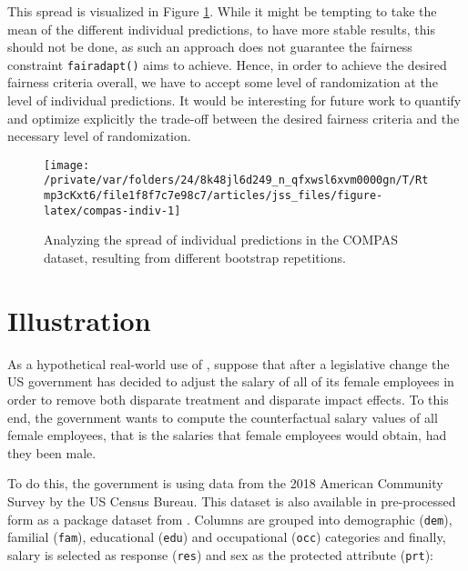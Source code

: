 \documentclass[
  nojss]{jss}
\begin{document}
This spread is visualized in Figure \ref{fig:compas-indiv}. While it
might be tempting to take the mean of the different individual
predictions, to have more stable results, this should not be done, as
such an approach does not guarantee the fairness constraint
\texttt{fairadapt()} aims to achieve. Hence, in order to achieve the
desired fairness criteria overall, we have to accept some level of
randomization at the level of individual predictions. It would be
interesting for future work to quantify and optimize explicitly the
trade-off between the desired fairness criteria and the necessary level
of randomization.

\begin{CodeChunk}
\begin{figure}

{\centering \texttt{[image: /private/var/folders/24/8k48jl6d249\_n\_qfxwsl6xvm0000gn/T/Rtmp3cKxt6/file1f8f7c7e98c7/articles/jss\_files/figure-latex/compas-indiv-1]} 

}

\caption[Analyzing the spread of individual predictions in the COMPAS dataset, resulting from different bootstrap repetitions]{Analyzing the spread of individual predictions in the COMPAS dataset, resulting from different bootstrap repetitions.}\label{fig:compas-indiv}
\end{figure}
\end{CodeChunk}

\hypertarget{illustration}{%
\section{Illustration}\label{illustration}}

As a hypothetical real-world use of , suppose that after
a legislative change the US government has decided to adjust the salary
of all of its female employees in order to remove both disparate
treatment and disparate impact effects. To this end, the government
wants to compute the counterfactual salary values of all female
employees, that is the salaries that female employees would obtain, had
they been male.

To do this, the government is using data from the 2018 American
Community Survey by the US Census Bureau. This dataset is also available
in pre-processed form as a package dataset from . Columns
are grouped into demographic (\texttt{dem}), familial (\texttt{fam}),
educational (\texttt{edu}) and occupational (\texttt{occ}) categories
and finally, salary is selected as response (\texttt{res}) and sex as
the protected attribute (\texttt{prt}):
\end{document}
